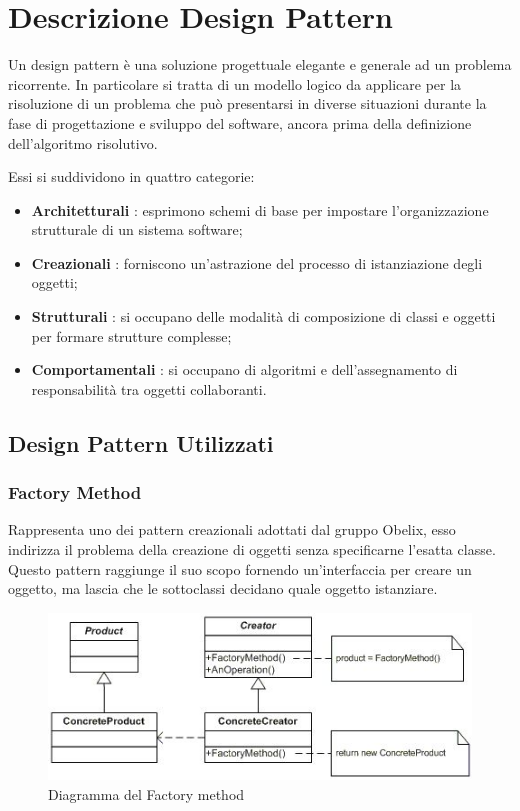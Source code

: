 \appendix

\section{Descrizione Design Pattern}

Un design pattern è una soluzione progettuale elegante e generale ad
un problema ricorrente. In particolare si tratta di un
modello logico da applicare per la risoluzione di un problema che può
presentarsi in diverse situazioni durante la fase di progettazione e
sviluppo del software, ancora prima della definizione dell'algoritmo
risolutivo. 

Essi si suddividono in quattro categorie: 


\begin{itemize}
	\item \textbf{Architetturali }: esprimono schemi di base per impostare l'organizzazione strutturale di un sistema software;
	\item \textbf{Creazionali }: forniscono un'astrazione del processo di istanziazione degli oggetti;
	\item \textbf{Strutturali }: si occupano delle modalità di composizione di classi e oggetti per formare strutture complesse;
	\item \textbf{Comportamentali }: si occupano di algoritmi e dell'assegnamento di responsabilità tra oggetti collaboranti.

\end{itemize}

\subsection{Design Pattern Utilizzati}

\subsubsection{Factory Method}
Rappresenta uno dei pattern creazionali adottati dal gruppo Obelix,
esso  indirizza il problema della creazione di oggetti senza
specificarne l'esatta classe. Questo pattern raggiunge il suo scopo
fornendo un'interfaccia per creare un oggetto, ma lascia che le
sottoclassi decidano quale oggetto istanziare. 

	\FloatBarrier
	\begin{figure}[ht]
		\centering
		\includegraphics[scale=0.45]{img/method.jpg}
		\caption{Diagramma del Factory method}
	\end{figure}


